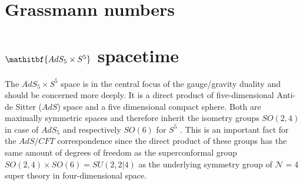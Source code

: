 %
%
%
%
%
\chapter{Grassmann numbers}

%
%
%
%
%
\chapter[$\mathbf{AdS_{5}\times S^{5}}$ spacetime]{$\mathitbf{AdS_{5}\times S^{5}}$ spacetime}%
The $AdS_{5}\times S^{5}$ space is in the central focus of the gauge/gravity duality and should be concerned more deeply. It is a direct product of five-dimensional Anti-de Sitter ($AdS$) space and a five dimensional compact sphere. Both are maximally symmetric spaces and therefore inherit the isometry groups $SO(2,4)$ in case of $AdS_{5}$ and respectively $SO(6)$ for $S^{5}$ \cite{Ammon:2015wua}. This is an important fact for the $AdS/CFT$ correspondence since the direct product of these groups has the same amount of degrees of freedom as the superconformal group $SO(2,4)\times SO(6) = SU(2,2\vert 4)$ as the underlying symmetry group of $\mathcal{N}=4$ super  theory in four-dimensional  space.
%
%
